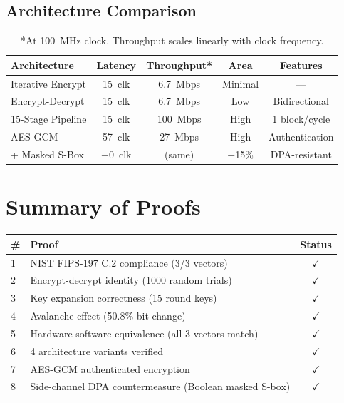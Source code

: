 \documentclass[11pt,a4paper]{article}
\newcommand{\checkmarkok}{$\checkmark$}
\begin{document}
\begin{center}
\end{center}

\subsection{Architecture Comparison}

\begin{table}[h]
\centering
\begin{tabular}{lcccc}
\toprule
\textbf{Architecture} & \textbf{Latency} & \textbf{Throughput*} & \textbf{Area} & \textbf{Features} \\
\midrule
Iterative Encrypt   & 15~clk & 6.7~Mbps & Minimal  & --- \\
Encrypt-Decrypt     & 15~clk & 6.7~Mbps & Low      & Bidirectional \\
15-Stage Pipeline   & 15~clk & 100~Mbps & High     & 1 block/cycle \\
AES-GCM             & 57~clk & 27~Mbps  & High     & Authentication \\
+ Masked S-Box      & +0~clk & (same)   & +15\%    & DPA-resistant \\
\bottomrule
\end{tabular}
\caption*{*At 100~MHz clock. Throughput scales linearly with clock frequency.}
\end{table}

\section{Summary of Proofs}

\begin{table}[h]
\centering
\begin{tabularx}{\textwidth}{lXc}
\toprule
\# & \textbf{Proof} & \textbf{Status} \\
\midrule
1 & NIST FIPS-197 C.2 compliance (3/3 vectors) & \checkmarkok \\
2 & Encrypt-decrypt identity (1000 random trials) & \checkmarkok \\
3 & Key expansion correctness (15 round keys) & \checkmarkok \\
4 & Avalanche effect (50.8\% bit change) & \checkmarkok \\
5 & Hardware-software equivalence (all 3 vectors match) & \checkmarkok \\
6 & 4 architecture variants verified & \checkmarkok \\
7 & AES-GCM authenticated encryption & \checkmarkok \\
8 & Side-channel DPA countermeasure (Boolean masked S-box) & \checkmarkok \\
\bottomrule
\end{tabularx}
\end{table}
\end{document}
